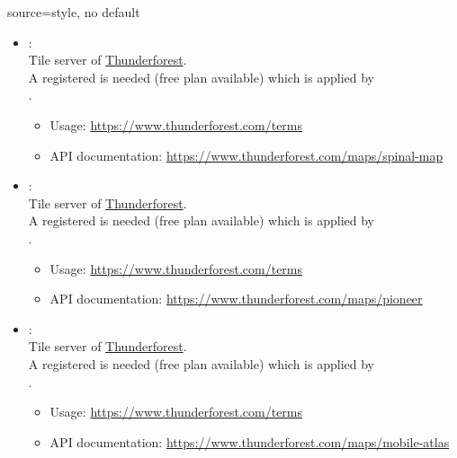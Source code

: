 \begin{docMrcKey}[supply]{source}{=}{style, no default}
\begin{itemize}
\clearpage
  \item{}:\\
    Tile server of \href{https://www.thunderforest.com}{Thunderforest}.\\
    A registered  is needed (free plan available)
    which is applied by\\
    .
    \begin{itemize}
    \item Usage: \url{https://www.thunderforest.com/terms}
    \item API documentation: \url{https://www.thunderforest.com/maps/spinal-map}
    \end{itemize}

  \item{}:\\
    Tile server of \href{https://www.thunderforest.com}{Thunderforest}.\\
    A registered  is needed (free plan available)
    which is applied by\\
    .
    \begin{itemize}
    \item Usage: \url{https://www.thunderforest.com/terms}
    \item API documentation: \url{https://www.thunderforest.com/maps/pioneer}
    \end{itemize}

  \item{}:\\
    Tile server of \href{https://www.thunderforest.com}{Thunderforest}.\\
    A registered  is needed (free plan available)
    which is applied by\\
    .
    \begin{itemize}
    \item Usage: \url{https://www.thunderforest.com/terms}
    \item API documentation: \url{https://www.thunderforest.com/maps/mobile-atlas}
    \end{itemize}


\end{itemize}
\end{docMrcKey}
